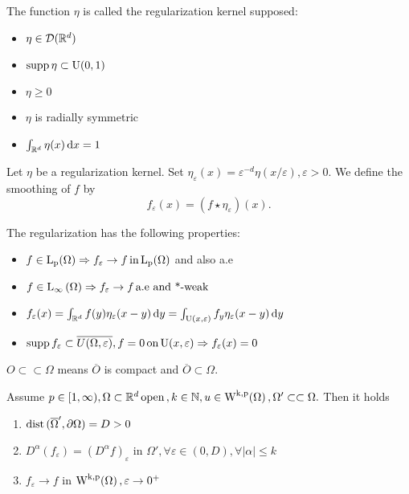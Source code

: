\documentclass{article}
\begin{document}
\begin{definition}
    The function $\eta$ is called the regularization kernel supposed:
    \begin{itemize}
	    \item $\eta \in \mathcal{D}({\mathbb R}^d)$
	    \item $\operatorname{supp} \eta \subset \text{U}(0,1)$
	    \item $\eta \geq 0$
	    \item $\eta$ is radially symmetric
	    \item $\int_{{\mathbb R}^d}\eta(x)\dd{x} = 1$
    \end{itemize}
\end{definition}

\begin{definition}
    Let $\eta$ be a regularization kernel. Set $\eta_{\varepsilon}(x) = \varepsilon^{-d} \eta (x/\varepsilon), \varepsilon >0.$ We define the smoothing of $f$ by
    \[
	    f_{\varepsilon}(x) = (f \star \eta_{\varepsilon})(x).
    \]
\end{definition}

\begin{remark}
	The regularization has the following properties:
	\begin{itemize}
		\item $f \in \LpSet{\Omega} \Rightarrow f_{\varepsilon} \to f \, \text{in} \, \LpSet{\Omega}$ and also a.e
		\item $f \in \text{L}_{\infty}\!\,\left(\Omega \right) \Rightarrow f_{\varepsilon} \to f \, \text{a.e and *-weak} \,$
		\item $f_{\varepsilon}(x) = \int_{{\mathbb R}^d}f(y)\eta_{\varepsilon}(x-y)\dd{y} = \int_{\text{U}(x,\varepsilon)}f_y \eta_{\varepsilon}(x-y)\dd{y}$
		\item $\operatorname{supp} f_{\varepsilon} \subset \overline{U(\Omega,\varepsilon)}, f=0 \, \text{on} \,\text{U}(x,\varepsilon) \Rightarrow f_{\varepsilon}(x)=0$
	\end{itemize}
\end{remark}

\begin{definition}
    $O \subset \subset \Omega$ means $\overline{O}$ is compact and $\overline{O}\subset \Omega$.
\end{definition}

\begin{lemma}
	Assume $p \in [1, \infty), \Omega \subset \R^d \, \text{open} \,, k \in \N, u \in \WkpSet{\Omega}, \Omega' \subset \subset \Omega.$ Then it holds
	\begin{enumerate}
		\item $\operatorname{dist}\, (\overline{\Omega}', \partial \Omega) = D >0$
		\item $D^\alpha(f_{\varepsilon}) = (D^\alpha f)_{\varepsilon}$ in $\Omega', \forall \varepsilon \in (0,D), \forall |\alpha| \leq k$
		\item $f_{\varepsilon}\to f$ in $\WkpSet{\Omega}, \varepsilon \to 0^+$
	\end{enumerate}
\end{lemma}
\end{document}
